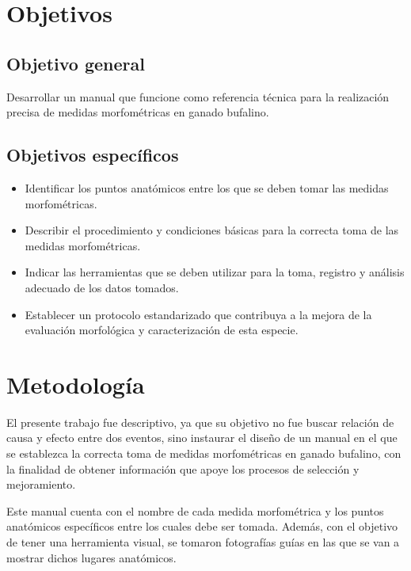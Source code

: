 \documentclass[
]{book}
\providecommand{\tightlist}{%
  \setlength{\itemsep}{0pt}\setlength{\parskip}{0pt}}
\begin{document}
\chapter{Objetivos}\label{objetivos}

\section{Objetivo general}\label{objetivo-general}

Desarrollar un manual que funcione como referencia técnica para la realización precisa de medidas morfométricas en ganado bufalino.

\section{Objetivos específicos}\label{objetivos-especuxedficos}

\begin{itemize}
\tightlist
\item
  Identificar los puntos anatómicos entre los que se deben tomar las medidas morfométricas.
\item
  Describir el procedimiento y condiciones básicas para la correcta toma de las medidas morfométricas.
\item
  Indicar las herramientas que se deben utilizar para la toma, registro y análisis adecuado de los datos tomados.
\item
  Establecer un protocolo estandarizado que contribuya a la mejora de la evaluación morfológica y caracterización de esta especie.
\end{itemize}

\chapter{Metodología}\label{metodologuxeda}

El presente trabajo fue descriptivo, ya que su objetivo no fue buscar relación de causa y efecto entre dos eventos, sino instaurar el diseño de un manual en el que se establezca la correcta toma de medidas morfométricas en ganado bufalino, con la finalidad de obtener información que apoye los procesos de selección y mejoramiento.

Este manual cuenta con el nombre de cada medida morfométrica y los puntos anatómicos específicos entre los cuales debe ser tomada. Además, con el objetivo de tener una herramienta visual, se tomaron fotografías guías en las que se van a mostrar dichos lugares anatómicos.
\end{document}
